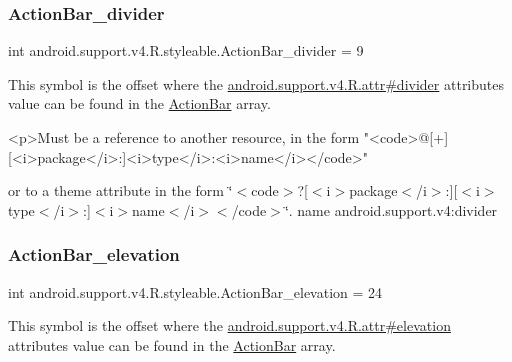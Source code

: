 \subsubsection{\texorpdfstring{Action\+Bar\+\_\+divider}{ActionBar\_divider}}
{\footnotesize\ttfamily int android.\+support.\+v4.\+R.\+styleable.\+Action\+Bar\+\_\+divider = 9\hspace{0.3cm}{\ttfamily [static]}}

This symbol is the offset where the \hyperlink{classandroid_1_1support_1_1v4_1_1R_1_1attr_a47e79e4bd7c9a45a24028c0210cf5744}{android.\+support.\+v4.\+R.\+attr\#divider} attribute\textquotesingle{}s value can be found in the \hyperlink{classandroid_1_1support_1_1v4_1_1R_1_1styleable_adc5a3492b9c46265760d7120a04d6afa}{Action\+Bar} array.

\begin{DoxyVerb}      <p>Must be a reference to another resource, in the form "<code>@[+][<i>package</i>:]<i>type</i>:<i>name</i></code>"
\end{DoxyVerb}
 or to a theme attribute in the form \char`\"{}$<$code$>$?\mbox{[}$<$i$>$package$<$/i$>$\+:\mbox{]}\mbox{[}$<$i$>$type$<$/i$>$\+:\mbox{]}$<$i$>$name$<$/i$>$$<$/code$>$\char`\"{}.  name android.\+support.\+v4\+:divider \mbox{\label{classandroid_1_1support_1_1v4_1_1R_1_1styleable_af9188f37272bce5af588009089023764}} 
\subsubsection{\texorpdfstring{Action\+Bar\+\_\+elevation}{ActionBar\_elevation}}
{\footnotesize\ttfamily int android.\+support.\+v4.\+R.\+styleable.\+Action\+Bar\+\_\+elevation = 24\hspace{0.3cm}{\ttfamily [static]}}

This symbol is the offset where the \hyperlink{classandroid_1_1support_1_1v4_1_1R_1_1attr_a5906f91b859c693a38a88ad3b0be4a39}{android.\+support.\+v4.\+R.\+attr\#elevation} attribute\textquotesingle{}s value can be found in the \hyperlink{classandroid_1_1support_1_1v4_1_1R_1_1styleable_adc5a3492b9c46265760d7120a04d6afa}{Action\+Bar} array.

